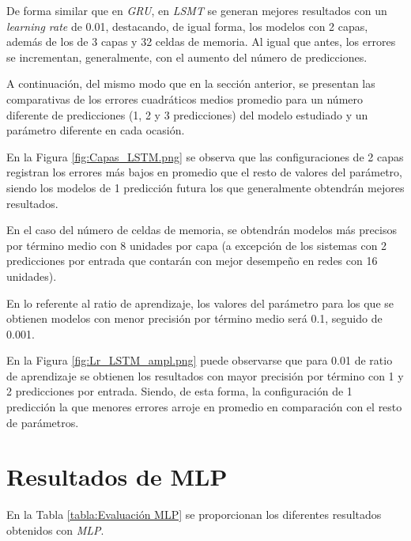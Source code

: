 De forma similar que en \textit{GRU}, en \textit{LSMT} se generan mejores resultados con un 
\textit{learning rate} de 0.01, destacando, de igual forma, los modelos con 2 capas, además
de los de 3 capas y 32 celdas de memoria.
Al igual que antes, los errores se incrementan, generalmente, con el aumento del número de predicciones.

A continuación, del mismo modo que en la sección anterior, se presentan las comparativas de los errores 
cuadráticos medios promedio para un número diferente de predicciones (1, 2 y 3 predicciones) del modelo estudiado y un parámetro diferente en cada ocasión.

En la Figura \ref{fig:Capas_LSTM.png} se observa que las configuraciones de 2 capas registran los 
errores más bajos en promedio que el resto de valores del parámetro, siendo los modelos de 1 predicción
futura los que generalmente obtendrán mejores resultados.

En el caso del número de celdas de memoria, se obtendrán modelos más precisos por término medio con 8 
unidades por capa (a excepción de los sistemas con 2 predicciones por entrada que contarán con mejor 
desempeño en redes con 16 unidades). 

En lo referente al ratio de aprendizaje, los valores del parámetro para los que se obtienen modelos
con menor precisión por término medio será 0.1, seguido de 0.001.

En la Figura \ref{fig:Lr_LSTM_ampl.png} puede observarse que para 0.01 de ratio de aprendizaje se obtienen
los resultados con mayor precisión por término con 1 y 2 predicciones por entrada. Siendo, de esta forma,
la configuración de 1 predicción la que menores errores arroje en promedio en comparación con el resto
de parámetros.

\newpage

\section{Resultados de MLP}
En la Tabla \ref{tabla:Evaluación MLP} se proporcionan los diferentes resultados obtenidos con \textit{MLP}.

